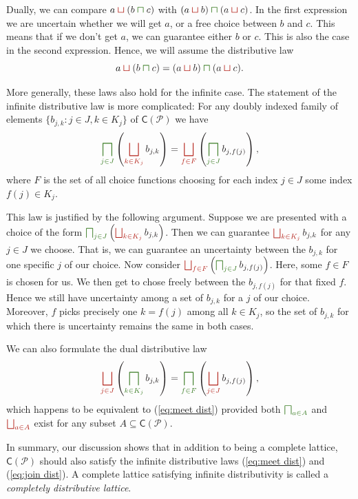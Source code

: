 \documentclass[12pt]{article}
\theoremstyle{definition}
\theoremstyle{plain}
\theoremstyle{plain}
\theoremstyle{plain}
\theoremstyle{plain}
\theoremstyle{remark}
\theoremstyle{remark}
\newcommand{\mc}[1]{\mathcal{#1}}
\newcommand{\sub}{\subseteq}
\newcommand{\cbigsqcap}[1]{\color{OliveGreen}\bigsqcap_{#1}\color{Black}}
\newcommand{\csqcap}{\color{OliveGreen}\bm{\sqcap}\color{Black}}
\newcommand{\cbigsqcup}[1]{\color{BrickRed}\bigsqcup_{#1}\color{Black}}
\newcommand{\csqcup}{\color{BrickRed}\bm{\sqcup}\color{Black}}
\begin{document}
Dually, we can compare $a \csqcup (b \csqcap c)$ with $(a \csqcup b) \csqcap (a \csqcup c)$. In the first expression we are uncertain whether we will get $a$, or a free choice between $b$ and $c$. This means that if we don't get $a$, we can guarantee either $b$ or $c$. This is also the case in the second expression. Hence, we will assume the distributive law $$a \csqcup (b \csqcap c) = (a \csqcup b) \csqcap (a \csqcup c).$$

More generally, these laws also hold for the infinite case. The statement of the infinite distributive law is more complicated: For any doubly indexed family of elements $\{b_{j,k} : j \in J, k \in K_j\}$ of $\mathsf{C}(\mc{P})$ we have
\begin{equation}\label{eq:meet dist}
	\cbigsqcap{j \in J} \left( \cbigsqcup{k \in K_j} b_{j,k} \right) = \cbigsqcup{f \in F} \left( \cbigsqcap{j \in J} b_{j,f(j)} \right),
\end{equation}
where $F$ is the set of all choice functions choosing for each index $j \in J$ some index $f(j) \in K_j$.

This law is justified by the following argument. Suppose we are presented with a choice of the form $\cbigsqcap{j \in J} \left( \cbigsqcup{k \in K_j} b_{j,k} \right)$. Then we can guarantee $\cbigsqcup{k \in K_j} b_{j,k} $ for any $j \in J$ we choose. That is, we can guarantee an uncertainty between the $b_{j,k}$ for one specific $j$ of our choice. Now consider $\cbigsqcup{f \in F} \left( \cbigsqcap{j \in J} b_{j,f(j)} \right)$. Here, some $f \in F$ is chosen for us. We then get to chose freely between the $b_{j,f(j)}$ for that fixed $f$. Hence we still have uncertainty among a set of $b_{j,k}$ for a $j$ of our choice. Moreover, $f$ picks precisely one $k = f(j)$ among all $k \in K_j$, so the set of $b_{j,k}$ for which there is uncertainty remains the same in both cases.

We can also formulate the dual distributive law
\begin{equation}\label{eq:join dist}
\cbigsqcup{j \in J} \left( \cbigsqcap{k \in K_j} b_{j,k} \right) = \cbigsqcap{f \in F} \left( \cbigsqcup{j \in J} b_{j,f(j)} \right),
\end{equation}
which happens to be equivalent to (\ref{eq:meet dist}) provided both $\cbigsqcap{a \in A}$ and $\cbigsqcup{a \in A}$ exist for any subset $A \sub \mathsf{C}(\mc{P})$.

In summary, our discussion shows that in addition to being a complete lattice, $\mathsf{C}(\mc{P})$ should also satisfy the infinite distributive laws (\ref{eq:meet dist}) and (\ref{eq:join dist}). A complete lattice satisfying infinite distributivity is called a \emph{completely distributive lattice}.
\end{document}
